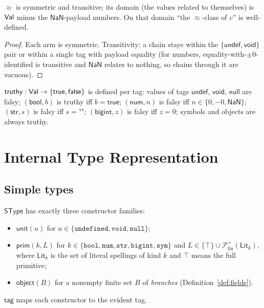 \documentclass[11pt]{article}
\newcommand{\SType}{\mathsf{SType}}
\newcommand{\tagfn}{\mathsf{tag}}
\begin{document}
\begin{lemma}
\label{lem:per}
$\approx$ is symmetric and transitive; its domain (the values related to
themselves) is $\mathsf{Val}$ minus the $\mathsf{NaN}$-payload numbers. On that
domain ``the $\approx$-class of $v$'' is well-defined.
\end{lemma}
\begin{proof}
Each arm is symmetric. Transitivity: a chain stays within the
$\{\mathsf{undef},\mathsf{void}\}$ pair or within a single tag with
payload equality (for numbers, equality-with-$\pm 0$-identified is
transitive and $\mathsf{NaN}$ relates to nothing, so chains through it are
vacuous).
\end{proof}

\begin{definition}[Truthiness]
\label{def:truthiness}
$\mathsf{truthy} : \mathsf{Val} \to \{\mathsf{true},\mathsf{false}\}$ is defined
per tag: values of tags $\mathsf{undef}$, $\mathsf{void}$, $\mathsf{null}$
are falsy; $(\mathsf{bool}, b)$ is truthy iff $b = \mathsf{true}$;
$(\mathsf{num}, n)$ is falsy iff $n \in \{0, -0, \mathsf{NaN}\}$;
$(\mathsf{str}, s)$ is falsy iff $s = \texttt{""}$;
$(\mathsf{bigint}, z)$ is falsy iff $z = 0$;
symbols and objects are always truthy.
\end{definition}

\section{Internal Type Representation}
\label{sec:representation}

\subsection{Simple types}

\begin{definition}
\label{def:stype}
$\SType$ has exactly three constructor families:
\begin{itemize}
\item $\mathsf{unit}(u)$ for $u \in \{\texttt{undefined}, \texttt{void},
  \texttt{null}\}$;
\item $\mathsf{prim}(k, L)$ for
  $k \in \{\texttt{bool}, \texttt{num}, \texttt{str}, \texttt{bigint},
  \texttt{sym}\}$ and $L \in \{\top\} \cup
  \mathcal{P}^{+}_{\mathrm{fin}}(\mathsf{Lit}_k)$, where $\mathsf{Lit}_k$ is
  the set of literal spellings of kind $k$ and $\top$ means the full
  primitive;
\item $\mathsf{object}(B)$ for a nonempty finite set $B$ of \emph{branches}
  (Definition~\ref{def:fields}).
\end{itemize}
$\tagfn$ maps each constructor to the evident tag.
\end{definition}
\end{document}
